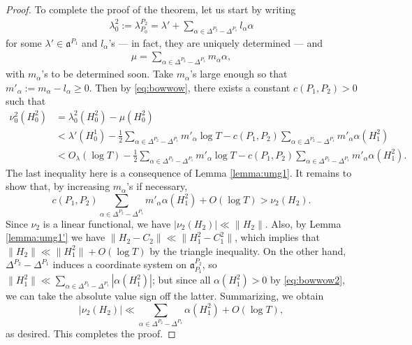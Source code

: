 \documentclass[10pt,a4paper]{amsart}
\newcommand{\ga}{\mathfrak{a}}
\begin{document}
\begin{proof}
To complete the proof of the theorem, let us start by writing
\begin{align*}
\lambda_0^2 := \lambda_{P_0}^{P_2} = \lambda' + \sum_{\alpha \in \Delta^{P_2} - \Delta^{P_1}} l_\alpha \alpha
\end{align*}
for some $\lambda' \in \ga^{P_1}$ and $l_\alpha$'s --- in fact, they are uniquely determined --- and
\begin{align*}
\mu = \sum_{\alpha \in \Delta^{P_2}-\Delta^{P_1}} m_\alpha \alpha,
\end{align*}
with $m_\alpha$'s to be determined soon. Take $m_\alpha$'s large enough so that $m'_\alpha := m_\alpha - l_\alpha \geq 0$.
Then by \eqref{eq:bowwow}, there exists a constant $c(P_1,P_2)>0$ such that
\begin{align*}
\nu_0^2(H_0^2) &= \lambda_0^2(H_0^2) - \mu(H_0^2) \\
&< \lambda'(H_0^1) -\frac{1}{2}\sum_{\alpha \in \Delta^{P_2} - \Delta^{P_1}} m'_\alpha\log T - c(P_1,P_2)\sum_{\alpha \in \Delta^{P_2} - \Delta^{P_1}} m'_\alpha\alpha(H_1^2) \\
&< O_\lambda(\log T) -\frac{1}{2}\sum_{\alpha \in \Delta^{P_2} - \Delta^{P_1}} m'_\alpha\log T - c(P_1,P_2)\sum_{\alpha \in \Delta^{P_2} - \Delta^{P_1}} m'_\alpha\alpha(H_1^2).
\end{align*}
The last inequality here is a consequence of Lemma \ref{lemma:umg1}.
It remains to show that, by increasing $m_\alpha$'s if necessary, 
\begin{equation*}
c(P_1,P_2)\sum_{\alpha \in \Delta^{P_2} - \Delta^{P_1}} m'_\alpha\alpha(H_1^2) + O(\log T) > \nu_2(H_2).
\end{equation*}
Since $\nu_2$ is a linear functional, we have $|\nu_2(H_2)| \ll \|H_2\|$. Also, by Lemma \ref{lemma:umg1'} we have $\|H_2-C_2\| \ll \|H_1^2-C_1^2\|$, which implies that $\|H_2\| \ll \|H_1^2\|+O(\log T)$ by the triangle inequality.
On the other hand, $\Delta^{P_2} - \Delta^{P_1}$ induces a coordinate system on $\ga_{P_1}^{P_2}$, so $\|H_1^2\| \ll \sum_{\alpha \in \Delta^{P_2} - \Delta^{P_1}} |\alpha(H_1^2)|$; but since all $\alpha(H_1^2) > 0$ by \eqref{eq:bowwow2}, we can take the absolute value sign off the latter. Summarizing, we obtain
\begin{equation*}
|\nu_2(H_2)| \ll \sum_{\alpha \in \Delta^{P_2} - \Delta^{P_1}} \alpha(H_1^2) + O(\log T),
\end{equation*}
as desired.
This completes the proof.
\end{proof}
\end{document}
